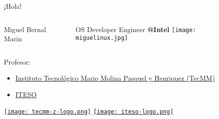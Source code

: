 
\begin{frame}[c]{¡Hola!}

  \begin{columns}
      Miguel Bernal Marin

      \vspace{\baselineskip}
      OS Developer Engineer \textbf{@Intel}
      \texttt{[image: miguelinux.jpg]}
  \end{columns}

  Profesor:
  \begin{itemize}
    \item \href{http://tecmm.edu.mx/}{Instituto Tecnológico Mario
      Molina Pasquel y Henriquez (TecMM)}
    \item \href{https://iteso.mx/}{ITESO}
  \end{itemize}

  \begin{center}
    \href{http://tecmm.edu.mx/}{\texttt{[image: tecmm-z-logo.png]}}
    \hspace{2cm}
    \href{https://iteso.mx/}{\texttt{[image: iteso-logo.png]}}
  \end{center}
\end{frame}
